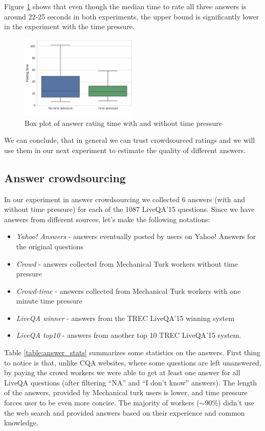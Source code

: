 \documentclass[11pt,letterpaper]{article}
\begin{document}
Figure \ref{figure:validation_time} shows that even though the median time to rate all three answers is around 22-25 seconds in both experiments, the upper bound is significantly lower in the experiment with the time pressure.

\begin{figure}[t!]
	\centering
	\includegraphics[width=0.5\textwidth]{img/validation_time}
	\caption{Box plot of answer rating time with and without time pressure}
	\label{figure:validation_time}
\end{figure}

We can conclude, that in general we can trust crowdsourced ratings and we will use them in our next experiment to estimate the quality of different answers.

\subsection{Answer crowdsourcing}
\label{subsec:results:answer_crowd}

In our experiment in answer crowdsourcing we collected 6 answers (with and without time pressure) for each of the 1087 LiveQA'15 questions.
Since we have answers from different sources, let's make the following notations:
\begin{itemize}
	\item \textit{Yahoo! Answers} - answers eventually posted by users on Yahoo! Answers for the original questions
	\item \textit{Crowd} - answers collected from Mechanical Turk workers without time pressure
	\item \textit{Crowd-time} - answers collected from Mechanical Turk workers with one minute time pressure
	\item \textit{LiveQA winner} - answers from the TREC LiveQA'15 winning system
	\item \textit{LiveQA top10} - answers from another top 10 TREC LiveQA'15 system.
\end{itemize}

Table \ref{table:answer_stats} summarizes some statistics on the answers.
First thing to notice is that, unlike CQA websites, where some questions are left unanswered, by paying the crowd workers we were able to get at least one answer for all LiveQA questions (after filtering ``NA'' and ``I don't know'' answers).
The length of the answers, provided by Mechanical turk users is lower, and time pressure forces user to be even more concise.
The majority of workers ($\sim90 \%$) didn't use the web search and provided answers based on their experience and common knowledge.
\end{document}
